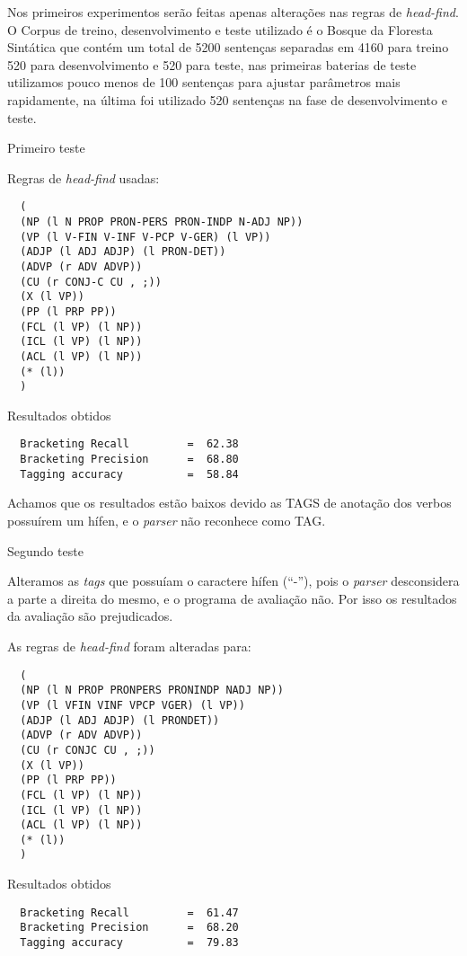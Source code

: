 Nos primeiros experimentos serão feitas apenas alterações nas regras de \emph{head-find}. O Corpus de treino, desenvolvimento e teste utilizado é o Bosque da Floresta Sintática que contém um total de 5200 sentenças separadas em 4160 para treino 520 para desenvolvimento e 520 para teste, nas primeiras baterias de teste utilizamos pouco menos de 100 sentenças para ajustar parâmetros mais rapidamente, na última foi utilizado 520 sentenças na fase de desenvolvimento e teste.

Primeiro teste

Regras de \emph{head-find} usadas:

\scriptsize
\begin{verbatim}
  (
  (NP (l N PROP PRON-PERS PRON-INDP N-ADJ NP))
  (VP (l V-FIN V-INF V-PCP V-GER) (l VP))
  (ADJP (l ADJ ADJP) (l PRON-DET))
  (ADVP (r ADV ADVP))
  (CU (r CONJ-C CU , ;))
  (X (l VP))
  (PP (l PRP PP))
  (FCL (l VP) (l NP))
  (ICL (l VP) (l NP))
  (ACL (l VP) (l NP))
  (* (l))
  )
\end{verbatim}

Resultados obtidos

\begin{verbatim}
  Bracketing Recall         =  62.38
  Bracketing Precision      =  68.80
  Tagging accuracy          =  58.84
\end{verbatim}

\normalsize
Achamos que os resultados estão baixos devido as TAGS de anotação dos verbos possuírem um hífen, e o \emph{parser} não reconhece como TAG.

Segundo teste

Alteramos as \emph{tags} que possuíam o caractere hífen (``-''), pois o \emph{parser} desconsidera a parte a direita do mesmo, e o programa de avaliação não. Por isso os resultados da avaliação são prejudicados.

As regras de \emph{head-find} foram alteradas para:

\scriptsize
\begin{verbatim}
  (
  (NP (l N PROP PRONPERS PRONINDP NADJ NP))
  (VP (l VFIN VINF VPCP VGER) (l VP))
  (ADJP (l ADJ ADJP) (l PRONDET))
  (ADVP (r ADV ADVP))
  (CU (r CONJC CU , ;))
  (X (l VP))
  (PP (l PRP PP))
  (FCL (l VP) (l NP))
  (ICL (l VP) (l NP))
  (ACL (l VP) (l NP))
  (* (l))
  )
\end{verbatim}

Resultados obtidos

\begin{verbatim}
  Bracketing Recall         =  61.47
  Bracketing Precision      =  68.20
  Tagging accuracy          =  79.83
\end{verbatim}

